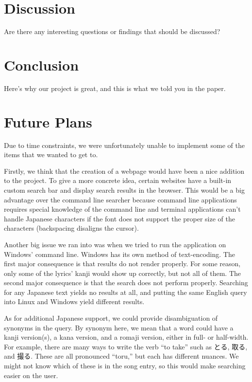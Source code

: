 \documentclass{acm} %
\begin{document}
\begin{CJK}{UTF8}{zhsong}
\section{Discussion}

Are there any interesting questions or findings that should be discussed?

\section{Conclusion}

Here's why our project is great, and this is what we told you in the paper.

\section{Future Plans}

Due to time constraints, we were unfortunately unable to implement some of the items that we wanted to get to.

Firstly, we think that the creation of a webpage would have been a nice addition to the project. To give a more concrete idea, certain websites have a built-in custom search bar and display search results in the browser. This would be a big advantage over the command line searcher because command line applications requires special knowledge of the command line and terminal applications can't handle Japanese characters if the font does not support the proper size of the characters (backspacing disaligns the cursor).

Another big issue we ran into was when we tried to run the application on Windows' command line. Windows has its own method of text-encoding. The first major consequence is that results do not render properly. For some reason, only some of the lyrics' kanji would show up correctly, but not all of them. The second major consequence is that the search does not perform properly. Searching for any Japanese text yields no results at all, and putting the same English query into Linux and Windows yield different results.

As for additional Japanese support, we could provide disambiguation of synonyms in the query. By synonym here, we mean that a word could have a kanji version(s), a kana version, and a romaji version, either in full- or half-width. For example, there are many ways to write the verb ``to take'' such as とる, 取る, and 撮る. These are all pronounced ``toru,'' but each has different nuances. We might not know which of these is in the song entry, so this would make searching easier on the user.


\end{CJK}
\end{document}

